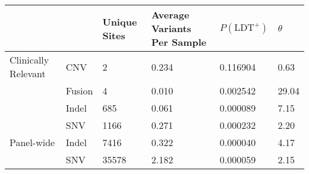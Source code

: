 \begin{tabular}{llC{0.75in}C{1in}C{0.75in}C{0.5in}}
\toprule
           &     &  Unique Sites & Average Variants Per Sample & $P(\text{LDT}^+)$ & $\theta$ \\
\midrule
Clinically Relevant & CNV &             2 &                       0.234 &          0.116904 &     0.63 \\
           & Fusion &             4 &                       0.010 &          0.002542 &    29.04 \\
           & Indel &           685 &                       0.061 &          0.000089 &     7.15 \\
           & SNV &          1166 &                       0.271 &          0.000232 &     2.20 \\
Panel-wide & Indel &          7416 &                       0.322 &          0.000040 &     4.17 \\
           & SNV &         35578 &                       2.182 &          0.000059 &     2.15 \\
\bottomrule
\end{tabular}
